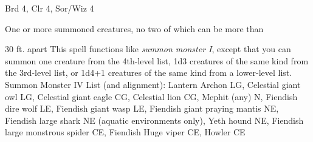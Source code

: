 
\begin{description*}
\item[Level:] Brd 4, Clr 4, Sor/Wiz 4
\item[Effect:] One or more summoned creatures, no two of which can be more than
\end{description*}

30 ft. apart
This spell functions like \textit{summon monster I}, except that you can summon
one creature from the 4th-level list, 1d3 creatures of the same kind from the 3rd-level
list, or 1d4+1 creatures of the same kind from a lower-level list.
Summon Monster IV List (and alignment): Lantern Archon LG, Celestial giant owl LG, Celestial giant eagle CG, Celestial lion CG, Mephit (any) N, Fiendish dire wolf LE, Fiendish giant wasp LE, Fiendish giant praying mantis NE, Fiendish large shark NE (aquatic environments only), Yeth hound NE, Fiendish large monstrous spider CE, Fiendish Huge viper CE, Howler CE